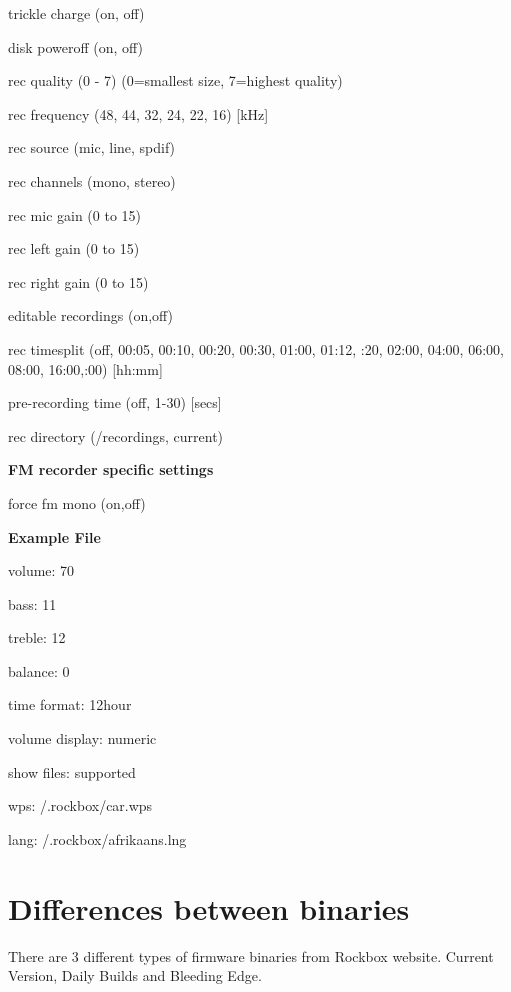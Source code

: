 trickle charge  (on, off)

disk poweroff  (on, off)

rec quality   (0 {}- 7) (0=smallest size, 7=highest quality)

rec frequency  (48, 44, 32, 24, 22, 16) [kHz]

rec source    (mic, line, spdif)

rec channels  (mono, stereo)

rec mic gain  (0 to 15)

rec left gain  (0 to 15)

rec right gain  (0 to 15)

editable recordings (on,off)

rec timesplit  (off, 00:05, 00:10, 00:20, 00:30, 01:00, 01:12, :20, 02:00, 04:00, 06:00, 08:00, 16:00,:00) [hh:mm]

pre{}-recording time (off, 1{}-30) [secs]

rec directory  (/recordings, current) 

{\bfseries
FM recorder specific settings}

\textmd{force fm mono  (on,off)}

\textbf{Example File}

volume: 70

bass: 11

treble: 12

balance: 0

time format: 12hour

volume display: numeric

show files: supported

wps: /.rockbox/car.wps

lang: /.rockbox/afrikaans.lng

\section{\label{ref:PartISection1}Differences between binaries}
There are 3 different types of firmware binaries from Rockbox website. Current Version, Daily Builds and Bleeding Edge.

